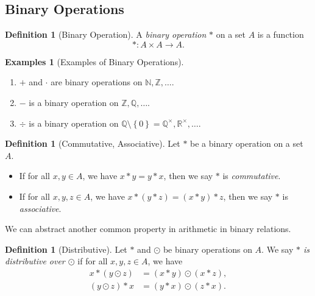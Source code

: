 \documentclass{article}
\theoremstyle{definition}
\newtheorem{definition}[theorem]{Definition}
\newtheorem{examples}[theorem]{Examples}
\theoremstyle{remark}
\newcommand{\pqty}[1]{\left(#1\right)}
\newcommand{\Bqty}[1]{\left\{#1\right\}}
\newcommand{\functiondomain}[3]{#1:#2\to #3}
\newcommand{\multiplicative}{^{\times}}
\newcommand{\NN}{\mathbb{N}}
\newcommand{\ZZ}{\mathbb{Z}}
\newcommand{\QQ}{\mathbb{Q}}
\newcommand{\RR}{\mathbb{R}}
\begin{document}
\subsection{Binary Operations}
\label{sec:binary-operations}

\begin{definition}[Binary Operation]
    A \emph{binary operation} \(\ast\) on a set \(A\) is a function
    \[
        \functiondomain{\ast}{A \times A}{A}.
    \]
\end{definition}

\begin{examples}[Examples of Binary Operations]
    \begin{enumerate}
        \item \(+\) and \(\cdot\) are binary operations on \(\NN, \ZZ, \ldots\).
        \item \(-\) is a binary operation on \(\ZZ, \QQ, \ldots\).
        \item \(\div\) is a binary operation on \(\QQ \setminus \Bqty{0} = \QQ\multiplicative, \RR\multiplicative, \ldots\).
    \end{enumerate}
\end{examples}

\begin{definition}[Commutative, Associative]
    Let \(\ast\) be a binary operation on a set \(A\).
    \begin{itemize}
        \item If for all \(x, y \in A\), we have \(x \ast y = y \ast x\), then we say \(\ast\) is \emph{commutative}.
        \item If for all \(x, y, z \in A\), we have \(x \ast \pqty{y \ast z} = \pqty{x \ast y} \ast z\), then we say \(\ast\) is \emph{associative}.
    \end{itemize}
\end{definition}

We can abstract another common property in arithmetic in binary relations.

\begin{definition}[Distributive]
    Let \(\ast\) and \(\odot\) be binary operations on \(A\). We say \emph{\(\ast\) is distributive over \(\odot\)} if for all \(x, y, z \in A\), we have
    \begin{align*}
        x \ast \pqty{y \odot z} &= \pqty{x \ast y} \odot \pqty{x \ast z}, \\
        \pqty{y \odot z} \ast x &= \pqty{y \ast x} \odot \pqty{z \ast x}.
    \end{align*}
\end{definition}
\end{document}
